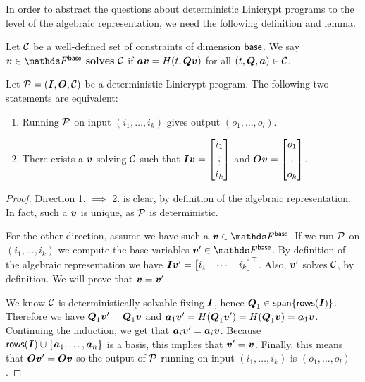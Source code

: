 In order to abstract the questions about deterministic Linicrypt programs to the level of the algebraic representation,
we need the following definition and lemma.

\begin{defn}
    Let $\C$ be a well-defined set of constraints of dimension $\base$.
    We say $\vv \in \Base$ \textbf{solves} $\C$ if
    $\va \vv = \H(t, \Q \vv)$ for all $(t, \Q, \va) \in \C$.
\end{defn}

\begin{lemma}
\label{det_solvable_equiv}
    Let $\P = (\I, \O, \C)$ be a deterministic Linicrypt program.
    The following two statements are equivalent:
    \begin{enumerate}
    \item
        Running $\P$ on input $(i_1, \dots, i_k)$ gives output $(o_1, \dots, o_l)$.
    \item 
        There exists a $\vv$ solving $\C$ such that
        $\I\vv = \m{i_1 \\ \vdots \\ i_k}$ and
        $\O\vv = \m{o_1 \\ \vdots \\ o_k}$.
    \end{enumerate}
\end{lemma}

\begin{proof}
    Direction 1. $\implies$ 2. is clear, by definition of the algebraic representation.
    In fact, such a $\vv$ is unique, as $\P$ is deterministic.
    
    For the other direction, assume we have such a $\vv \in \Base$.
    If we run $\P$ on $(i_1, \dots, i_k)$ we compute the base variables $\vv' \in \Base$.
    By definition of the algebraic representation we have $\I \vv' = \m{i_1&\cdots&i_k}^\top$.
    Also, $\vv'$ solves $\C$, by definition.
    We will prove that $\vv = \vv'$.

    We know $\C$ is deterministically solvable fixing $\I$, hence
    $\Q_1 \in \spn\{ \rows(\I)\}$. 
    Therefore we have $\Q_1 \vv' = \Q_1 \vv$ and 
    $\va_1 \vv' = \H(\Q_1 \vv') = \H(\Q_1 \vv) = \va_1 \vv$.
    Continuing the induction, we get that $\va_i \vv' = \va_i \vv$.
    Because $\rows(\I) \cup \{\va_1, \dots, \va_n\}$ is a basis, this implies that $\vv' = \vv$.
    Finally, this means that $\O \vv' = \O \vv$ 
    so the output of $\P$ running on input $(i_1, \dots, i_k)$ is $(o_1, \dots, o_l)$.
\end{proof}


